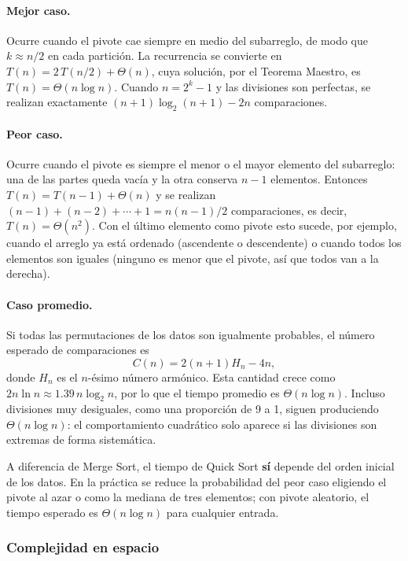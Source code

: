 \documentclass[11pt,letterpaper]{article}
\begin{document}
\paragraph{Mejor caso.} Ocurre cuando el pivote cae siempre en medio del subarreglo, de modo que $k \approx n/2$ en cada partición. La recurrencia se convierte en $T(n) = 2\,T(n/2) + \Theta(n)$, cuya solución, por el Teorema Maestro, es $T(n) = \Theta(n \log n)$. Cuando $n = 2^k - 1$ y las divisiones son perfectas, se realizan exactamente $(n+1)\log_2(n+1) - 2n$ comparaciones.

\paragraph{Peor caso.} Ocurre cuando el pivote es siempre el menor o el mayor elemento del subarreglo: una de las partes queda vacía y la otra conserva $n - 1$ elementos. Entonces $T(n) = T(n-1) + \Theta(n)$ y se realizan $(n-1) + (n-2) + \cdots + 1 = n(n-1)/2$ comparaciones, es decir, $T(n) = \Theta(n^2)$. Con el último elemento como pivote esto sucede, por ejemplo, cuando el arreglo ya está ordenado (ascendente o descendente) o cuando todos los elementos son iguales (ninguno es menor que el pivote, así que todos van a la derecha).

\paragraph{Caso promedio.} Si todas las permutaciones de los datos son igualmente probables, el número esperado de comparaciones es
\[
  C(n) = 2(n+1)H_n - 4n,
\]
donde $H_n$ es el $n$-ésimo número armónico. Esta cantidad crece como $2n\ln n \approx 1.39\,n\log_2 n$, por lo que el tiempo promedio es $\Theta(n \log n)$. Incluso divisiones muy desiguales, como una proporción de 9 a 1, siguen produciendo $\Theta(n \log n)$: el comportamiento cuadrático solo aparece si las divisiones son extremas de forma sistemática.

A diferencia de Merge Sort, el tiempo de Quick Sort \textbf{sí} depende del orden inicial de los datos. En la práctica se reduce la probabilidad del peor caso eligiendo el pivote al azar o como la mediana de tres elementos; con pivote aleatorio, el tiempo esperado es $\Theta(n \log n)$ para cualquier entrada.

\subsubsection{Complejidad en espacio}
\end{document}
